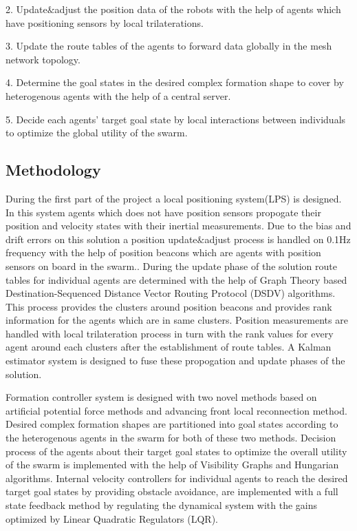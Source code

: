 \documentclass[twoside]{article}
\begin{document}
2. Update$\&$adjust the position data of the robots with the help of agents which have positioning sensors by local trilaterations.

3. Update the route tables of the agents to forward data globally in the mesh network topology.

4. Determine the goal states in the desired complex formation shape to cover by heterogenous agents with the help of a central server.

5. Decide each agents' target goal state by local interactions between individuals to optimize the global utility of the swarm.


\subsection{Methodology}

During the first part of the project a local positioning system(LPS) is designed. In this system agents which does not have position sensors propogate their position and velocity states with their inertial measurements. Due to the bias and drift errors on this solution a position update$\&$adjust process is handled on 0.1Hz frequency with the help of position beacons which are agents with position sensors on board in the swarm.. During the update phase of the solution route tables for individual agents are determined with the help of Graph Theory based Destination-Sequenced Distance Vector Routing Protocol (DSDV) algorithms. This process provides the clusters around position beacons and provides rank information for the agents which are in same clusters. Position measurements are handled with local trilateration process in turn with the rank values for every agent around each clusters after the establishment of route tables. A Kalman estimator system is designed to fuse these propogation and update phases of the solution.

Formation controller system is designed with two novel methods based on artificial potential force methods and advancing front local reconnection method. Desired complex formation shapes are partitioned into goal states according to the heterogenous agents in the swarm for both of these two methods. Decision process of the agents about their target goal states to optimize the overall utility of the swarm is implemented with the help of Visibility Graphs and Hungarian algorithms. Internal velocity controllers for individual agents to reach the desired target goal states by providing obstacle avoidance, are implemented with a full state feedback method by regulating the dynamical system with the gains optimized by Linear Quadratic Regulators (LQR).
\end{document}
